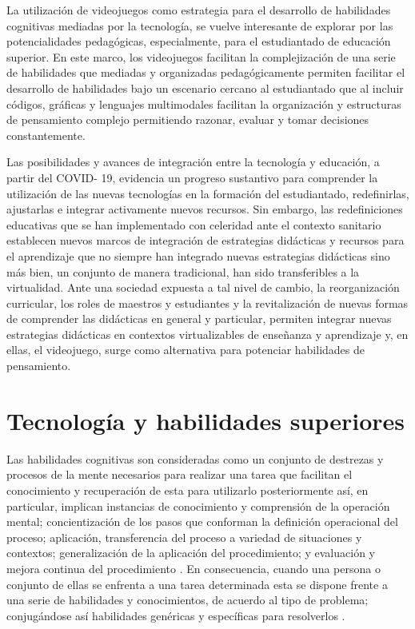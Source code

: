 \documentclass{textolivre}
\begin{document}
La utilización de videojuegos como estrategia para el desarrollo de habilidades cognitivas mediadas por la tecnología, se vuelve interesante de explorar por las potencialidades pedagógicas, especialmente, para el estudiantado de educación superior. En este marco, los videojuegos facilitan la complejización de una serie de habilidades que mediadas y organizadas pedagógicamente permiten facilitar el desarrollo de habilidades bajo un escenario cercano al estudiantado que al incluir códigos, gráficas y lenguajes multimodales facilitan la organización y estructuras de pensamiento complejo permitiendo razonar, evaluar y tomar decisiones constantemente.

Las posibilidades y avances de integración entre la tecnología y educación, a partir del COVID- 19, evidencia un progreso sustantivo para comprender la utilización de las nuevas tecnologías en la formación del estudiantado, redefinirlas, ajustarlas e integrar activamente nuevos recursos. Sin embargo, las redefiniciones educativas que se han implementado con celeridad ante el contexto sanitario establecen nuevos marcos de integración de estrategias didácticas y recursos para el aprendizaje que no siempre han integrado nuevas estrategias didácticas sino más bien, un conjunto de manera tradicional, han sido transferibles a la virtualidad. Ante una sociedad expuesta a tal nivel de cambio, la reorganización curricular, los roles de maestros y estudiantes y la revitalización de nuevas formas de comprender las didácticas en general y particular, permiten integrar nuevas estrategias didácticas en contextos virtualizables de enseñanza y aprendizaje y, en ellas, el videojuego, surge como alternativa para potenciar habilidades de pensamiento.

\section{Tecnología y habilidades superiores}\label{techab}

Las habilidades cognitivas son consideradas como un conjunto de destrezas y procesos de la mente necesarios para realizar una tarea que facilitan el conocimiento y recuperación de esta para utilizarlo posteriormente \cite{ramos2010} %
así, en particular, implican instancias de conocimiento y comprensión de la operación mental; concientización de los pasos que conforman la definición operacional del proceso; aplicación, transferencia del proceso a variedad de situaciones y contextos; generalización de la aplicación del procedimiento; y evaluación y mejora continua del procedimiento \cite{sanchez2002}. %
En consecuencia, cuando una persona o conjunto de ellas se enfrenta a una tarea determinada esta se dispone frente a una serie de habilidades y conocimientos, de acuerdo al tipo de problema; conjugándose así habilidades genéricas y específicas para resolverlos \cite{pozo1994}.%
\end{document}
